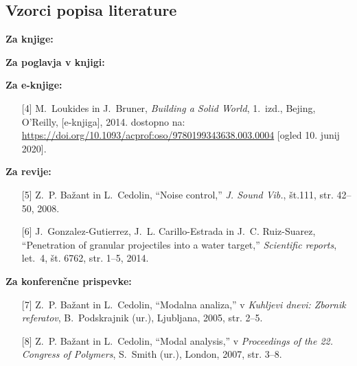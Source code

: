 \subsection{Vzorci popisa literature}\label{sec:vzorci_lit}

\textbf{Za knjige:}

\textbf{Za poglavja v knjigi:}

\textbf{Za e-knjige:}
\begin{itemize}
\item[{[4]}] M.~Loukides in J.~Bruner, \emph{Building a Solid World}, 1.~izd., 
Bejing, O'Reilly, [e-knjiga], 2014. dostopno na:
\url{https://doi.org/10.1093/acprof:oso/9780199343638.003.0004} [ogled 10.
junij 2020].
\end{itemize}

\textbf{Za revije:}
\begin{itemize}
\item[{[5]}] Z.~P. Ba\v{z}ant in L.~Cedolin, ``Noise control,'' \emph{J. Sound 
Vib.}, št.111, str. 42--50, 2008.\\
\item[{[6]}] J.~Gonzalez-Gutierrez, J.~L. Carillo-Estrada in J.~C. Ruiz-Suarez,
``Penetration of granular projectiles into a water target,'' \emph{Scientific
reports}, let.~4, št. 6762, str. 1--5, 2014.
\end{itemize}

\textbf{Za konferenčne prispevke:}
\begin{itemize}
\item[{[7]}] Z.~P. Ba\v{z}ant in L.~Cedolin, ``Modalna analiza,'' v 
\emph{Kuhljevi dnevi: Zbornik referatov}, B.~Podskrajnik (ur.), Ljubljana, 
2005, str. 2--5.\\

\item[{[8]}] Z.~P. Ba\v{z}ant in L.~Cedolin, ``Modal analysis,'' v 
\emph{Proceedings of the 22. Congress of Polymers}, S.~Smith (ur.), London, 
2007, str. 3--8.\\
\end{itemize}

